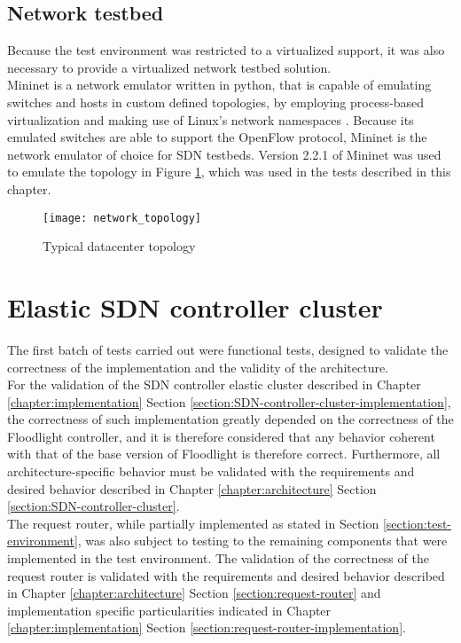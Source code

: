 \subsection{Network testbed}
\label{subsection:Mininet}
Because the test environment was restricted to a virtualized support, it was also necessary to provide a virtualized network testbed solution.\\
Mininet is a network emulator written in python, that is capable of emulating switches and hosts in custom defined topologies, by employing process-based virtualization and making use of Linux's network namespaces \cite{mininet}.
Because its emulated switches are able to support the OpenFlow protocol, Mininet is the network emulator of choice for \gls{SDN} testbeds.
Version 2.2.1 of Mininet was used to emulate the topology in Figure \ref{fig:network_topology}, which was used in the tests described in this chapter.
%
\begin{figure}
	\centering
	\texttt{[image: network\_topology]}
	\caption{Typical datacenter topology}
	\label{fig:network_topology}
\end{figure}
%
\section{Elastic SDN controller cluster}
\label{section:functional-tests}
The first batch of tests carried out were functional tests, designed to validate the correctness of the implementation and the validity of the architecture.\\
%
For the validation of the \gls{SDN} controller elastic cluster described in Chapter \ref*{chapter:implementation} Section \ref{section:SDN-controller-cluster-implementation}, the correctness of such implementation greatly depended on the correctness of the Floodlight controller, and it is therefore considered that any behavior coherent with that of the base version of Floodlight is therefore correct.
Furthermore, all architecture-specific behavior must be validated with the requirements and desired behavior described in Chapter \ref*{chapter:architecture} Section \ref{section:SDN-controller-cluster}.\\
%
The request router, while partially implemented as stated in Section \ref{section:test-environment}, was also subject to testing to the remaining components that were implemented in the test environment.
The validation of the correctness of the request router is validated with the requirements and desired behavior described in Chapter \ref*{chapter:architecture} Section \ref{section:request-router} and implementation specific particularities indicated in Chapter \ref*{chapter:implementation} Section \ref{section:request-router-implementation}.
%
%
